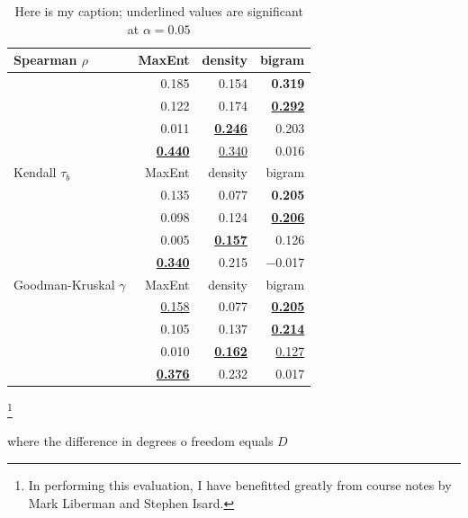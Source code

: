 \begin{table}
\centering

\begin{tabular}{l r r r}
\toprule
Spearman $\rho$             & MaxEnt              & density             & bigram              \\
\midrule
\citeauthor{Greenberg1964a} & 0.185               & 0.154               & \textbf{0.319}      \\
\citeauthor{Scholes1966}    & 0.122               & 0.174               & \ul{\textbf{0.292}} \\
\citeauthor{Albright2003a}  & 0.011               & \ul{\textbf{0.246}} & 0.203               \\
\citeauthor{Albright2007}   & \ul{\textbf{0.440}} & \ul{0.340}          & 0.016               \\ 
\bottomrule
Kendall $\tau_b$            & MaxEnt              & density             & bigram \\
\midrule
\citeauthor{Greenberg1964a} & 0.135               & 0.077               & \textbf{0.205}      \\
\citeauthor{Scholes1966}    & 0.098               & 0.124               & \ul{\textbf{0.206}} \\
\citeauthor{Albright2003a}  & 0.005               & \ul{\textbf{0.157}} & 0.126               \\
\citeauthor{Albright2007}   & \ul{\textbf{0.340}} & 0.215               & $-$0.017            \\
\bottomrule
Goodman-Kruskal $\gamma$    & MaxEnt              & density             & bigram \\
\midrule
\citeauthor{Greenberg1964a} & \ul{0.158}          & 0.077               & \ul{\textbf{0.205}} \\
\citeauthor{Scholes1966}    & 0.105               & 0.137               & \ul{\textbf{0.214}} \\
\citeauthor{Albright2003a}  & 0.010               & \ul{\textbf{0.162}} & \ul{0.127}          \\
\citeauthor{Albright2007}   & \ul{\textbf{0.376}} & 0.232               & 0.017               \\
\bottomrule
\end{tabular}

\caption{Here is my caption; underlined values are significant at $\alpha = 0.05$}
\end{table}

%


\citet{EM}

\footnote{In performing this evaluation, I have benefitted greatly from course notes by Mark Liberman and Stephen Isard.}


where the difference in degrees o freedom equals $D$

